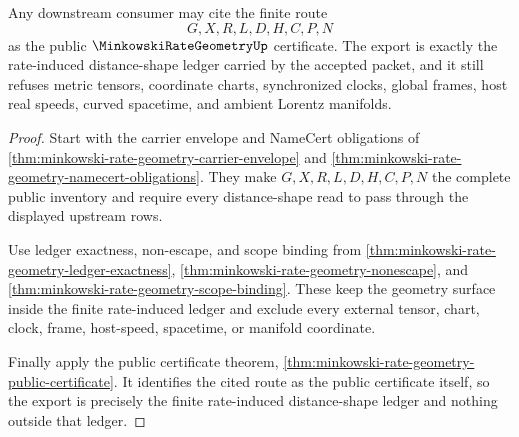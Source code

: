 \begin{theorem}
\label{thm:minkowski-rate-geometry-public-export}
Any downstream consumer may cite the finite route
$$
G,X,R,L,D,H,C,P,N
$$
as the public $\MinkowskiRateGeometryUp$ certificate. The export is exactly the rate-induced distance-shape ledger carried by the accepted packet, and it still refuses metric tensors, coordinate charts, synchronized clocks, global frames, host real speeds, curved spacetime, and ambient Lorentz manifolds.
\end{theorem}
\begin{proof}
Start with the carrier envelope and NameCert obligations of \autoref{thm:minkowski-rate-geometry-carrier-envelope} and \autoref{thm:minkowski-rate-geometry-namecert-obligations}. They make $G,X,R,L,D,H,C,P,N$ the complete public inventory and require every distance-shape read to pass through the displayed upstream rows.

Use ledger exactness, non-escape, and scope binding from \autoref{thm:minkowski-rate-geometry-ledger-exactness}, \autoref{thm:minkowski-rate-geometry-nonescape}, and \autoref{thm:minkowski-rate-geometry-scope-binding}. These keep the geometry surface inside the finite rate-induced ledger and exclude every external tensor, chart, clock, frame, host-speed, spacetime, or manifold coordinate.

Finally apply the public certificate theorem, \autoref{thm:minkowski-rate-geometry-public-certificate}. It identifies the cited route as the public certificate itself, so the export is precisely the finite rate-induced distance-shape ledger and nothing outside that ledger.
\end{proof}





